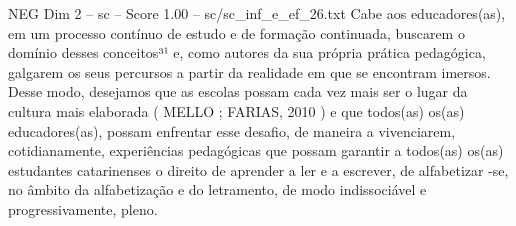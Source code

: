 \begin{textsample}{NEG Dim 2 – sc – Score 1.00 – sc/sc\_inf\_e\_ef\_26.txt}
Cabe aos educadores(as), em um processo contínuo de estudo e de formação continuada, buscarem o domínio desses conceitos³¹ e, como autores da sua própria prática pedagógica, galgarem os seus percursos a partir da realidade em que se encontram imersos.
Desse modo, desejamos que as escolas possam cada vez mais ser o lugar da cultura mais elaborada ( MELLO ; FARIAS, 2010 ) e que todos(as) os(as) educadores(as), possam enfrentar esse desafio, de maneira a vivenciarem, cotidianamente, experiências pedagógicas que possam garantir a todos(as) os(as) estudantes catarinenses o direito de aprender a ler e a escrever, de alfabetizar -se, no âmbito da alfabetização e do letramento, de modo indissociável e progressivamente, pleno.

\end{textsample}
